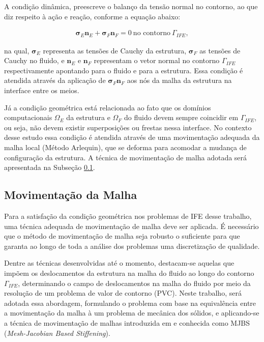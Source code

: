 \documentclass[tese_patricia]{subfiles}
\begin{document}
A condição dinâmica, preescreve o balanço da tensão normal no contorno, ao que diz respeito à ação e reação, conforme a equação abaixo:

\begin{align}
	\mathbf{\sigma}_{E}\mathbf{n}_{E} + \mathbf{\sigma}_{F}\mathbf{n}_{F} = 0 \ \textrm{no contorno} \ \Gamma_{IFE},
\end{align}

\noindent na qual, $\mathbf{\sigma}_{E}$ representa as tensões de Cauchy da estrutura, $\mathbf{\sigma}_{F}$ as tensões de Cauchy no fluido, e $\mathbf{n}_E$ e $\mathbf{n}_F$ representam o vetor normal no contorno $\Gamma_{IFE}$ respectivamente apontando para o fluido e para a estrutura. Essa condição é atendida através da aplicação de $\mathbf{\sigma}_{F}\mathbf{n}_{F}$ aos nós da malha da estrutura na interface entre os meios.

Já a condição geométrica está relacionada ao fato que os domínios computacionais $\Omega_E$ da estrutura e $\Omega_F$ do fluido devem sempre coincidir em $\Gamma_{IFE}$, ou seja, não devem existir superposições ou frestas nessa interface. No contexto desse estudo essa condição é atendida através de uma movimentação adequada da malha local (Método Arlequin), que se deforma para acomodar a mudança de configuração da estrutura. A técnica de movimentação de malha adotada será apresentada na Subseção \ref{subsec:MovMalha}.

\subsection{Movimentação da Malha} \label{subsec:MovMalha}

Para a satisfação da condição geométrica nos problemas de IFE desse trabalho, uma técnica adequada de movimentação de malha deve ser aplicada. É necessário que o método de movimentação de malha seja robusto o suficiente para que garanta ao longo de toda a análise dos problemas uma discretização de qualidade.

Dentre as técnicas desenvolvidas até o momento, destacam-se aquelas que impõem os deslocamentos da estrutura na malha do fluido ao longo do contorno $\Gamma_{IFE}$, determinando o campo de deslocamentos na malha do fluido por meio da resolução de um problema de valor de contorno (PVC). Neste trabalho, será adotada essa abordagem, formulando o problema com base na equivalência entre a movimentação da malha à um problema de mecânica dos sólidos, e aplicando-se a técnica de movimentação de malhas introduzida em  e  conhecida como MJBS (\textit{Mesh-Jacobian Based Stiffening}).
\end{document}
